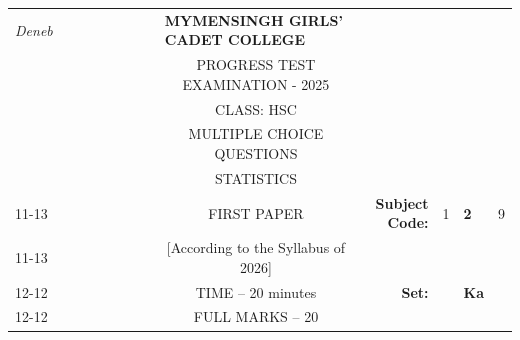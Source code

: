 \documentclass[12pt]{exam}
\begin{document}
\begin{table}[]
\begin{tabular}{llllllllcllll}
\textit{Deneb} &  &  &  &  &  &  &  & \multicolumn{1}{l}{\textbf{MYMENSINGH GIRLS' CADET COLLEGE}} &                                             &                        &                                 &                        \\
                &  &  &  &  &  &  &  & \multicolumn{1}{c}{PROGRESS TEST EXAMINATION - 2025}       &                                             &                        & \multicolumn{1}{c}{}            &                        \\
                &  &  &  &  &  &  &  & CLASS: HSC                                                   &                                             &                        & \multicolumn{1}{c}{}            &                        \\
                &  &  &  &  &  &  &  & MULTIPLE CHOICE QUESTIONS                                    &                                             &                        & \multicolumn{1}{c}{}            &                        \\
                &  &  &  &  &  &  &  & STATISTICS                                                   &                                             &                        & \multicolumn{1}{r}{}            &                        \\ \cline{11-13} 
                &  &  &  &  &  &  &  & FIRST PAPER                                                 & \multicolumn{1}{r|}{\textbf{Subject Code:}} & \multicolumn{1}{l|}{1} & \multicolumn{1}{l|}{\textbf{2}} & \multicolumn{1}{l|}{9} \\ \cline{11-13} 
                &  &  &  &  &  &  &  & [According to the Syllabus of 2026]                          & \multicolumn{1}{r}{}                        &                        &                                 &                        \\ \cline{12-12}
                &  &  &  &  &  &  &  & TIME – 20 minutes                                            & \multicolumn{1}{r}{\textbf{Set:}}           & \multicolumn{1}{l|}{}  & \multicolumn{1}{l|}{\textbf{Ka}} &                        \\ \cline{12-12}
                &  &  &  &  &  &  &  & FULL MARKS – 20                                              &                                             &                        &                                 &                       
\end{tabular}
\end{table}
\end{document}
